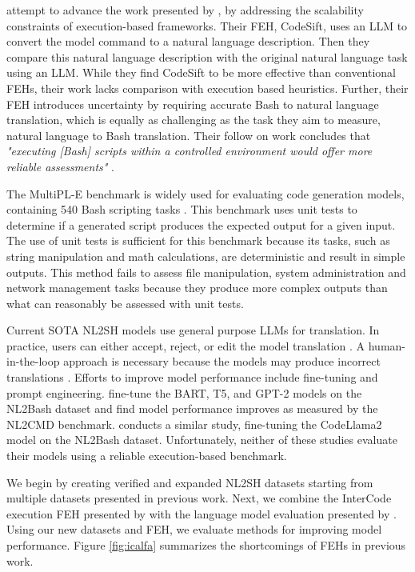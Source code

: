 \citet{codesift} attempt to advance the work presented by \citet{tsed}, by addressing the scalability constraints of execution-based frameworks. Their FEH, CodeSift, uses an LLM to convert the model command to a natural language description. Then they compare this natural language description with the original natural language task using an LLM. While they find CodeSift to be more effective than conventional FEHs, their work lacks comparison with execution based heuristics. Further, their FEH introduces uncertainty by requiring accurate Bash to natural language translation, which is equally as challenging as the task they aim to measure, natural language to Bash translation. Their follow on work concludes that \textit{"executing [Bash] scripts within a controlled environment would offer more reliable assessments"} \cite{scriptsmith}.

The MultiPL-E benchmark is widely used for evaluating code generation models, containing 540 Bash scripting tasks \cite{multiple}. This benchmark uses unit tests to determine if a generated script produces the expected output for a given input. The use of unit tests is sufficient for this benchmark because its tasks, such as string manipulation and math calculations, are deterministic and result in simple outputs. This method fails to assess file manipulation, system administration and network management tasks because they produce more complex outputs than what can reasonably be assessed with unit tests.

Current SOTA NL2SH models use general purpose LLMs for translation. In practice, users can either accept, reject, or edit the model translation \cite{warp,copilot}. A human-in-the-loop approach is necessary because the models may produce incorrect translations \cite{qwen}. Efforts to improve model performance include fine-tuning and prompt engineering. \citet{finetune} fine-tune the BART, T5, and GPT-2 models on the NL2Bash dataset and find model performance improves as measured by the NL2CMD benchmark. \citet{bash-assistant} conducts a similar study, fine-tuning the CodeLlama2 model on the NL2Bash dataset. Unfortunately, neither of these studies evaluate their models using a reliable execution-based benchmark.

We begin by creating verified and expanded NL2SH datasets starting from multiple datasets presented in previous work. Next, we combine the InterCode execution FEH presented by \citet{InterCode} with the language model evaluation presented by \citet{tsed}. Using our new datasets and FEH, we evaluate methods for improving model performance. Figure \ref{fig:icalfa} summarizes the shortcomings of FEHs in previous work.